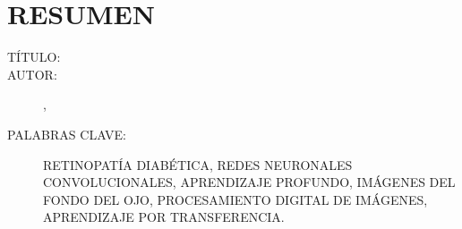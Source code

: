 \chapter*{RESUMEN}

\footnotesize{
\begin{description}
  \item[TÍTULO:] \MakeUppercase{\titulo}
  \item[AUTOR:]{\autora}, {\autorb}
  \item[PALABRAS CLAVE:] RETINOPATÍA DIABÉTICA, REDES NEURONALES CONVOLUCIONALES, APRENDIZAJE PROFUNDO, IMÁGENES DEL FONDO DEL OJO, PROCESAMIENTO DIGITAL DE IMÁGENES, APRENDIZAJE POR TRANSFERENCIA.

\end{description}}
